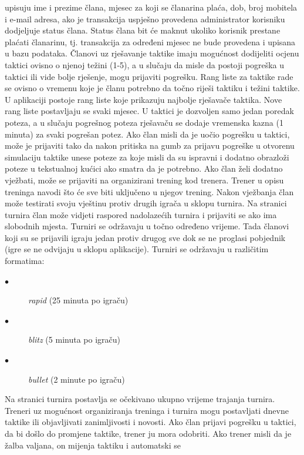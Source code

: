 			upisuju ime i prezime člana, mjesec za koji se članarina plaća, dob,
			broj mobitela i e-mail adresa, ako je transakcija uspješno provedena
			administrator korisniku dodjeljuje status člana. Status člana bit će
			maknut ukoliko korisnik prestane plaćati članarinu, tj. transakcija za
			određeni mjesec ne bude provedena i upisana u bazu podataka. Članovi uz
			rješavanje taktike imaju mogućnost dodijeliti ocjenu taktici ovisno o
			njenoj težini (1-5), a u slučaju da misle da postoji pogreška u taktici
			ili vide bolje rješenje, mogu prijaviti pogrešku. Rang liste za taktike
			rade se ovisno o vremenu koje je članu potrebno da točno riješi taktiku
			i težini taktike. U aplikaciji postoje rang liste koje prikazuju
			najbolje rješavače taktika. Nove rang liste postavljaju se svaki mjesec.
			U taktici je dozvoljen samo jedan poredak poteza, a u slučaju pogrešnog
			poteza rješavaču se dodaje vremenska kazna (1 minuta) za svaki pogrešan
			potez. Ako član misli da je uočio pogrešku u taktici, može je prijaviti
			tako da nakon pritiska na gumb za prijavu pogreške u otvorenu simulaciju
			taktike unese poteze za koje misli da su ispravni i dodatno obrazloži
			poteze u tekstualnoj kućici ako smatra da je potrebno. Ako član želi
			dodatno vježbati, može se prijaviti na organizirani trening kod trenera.
			Trener u opisu treninga navodi što će sve biti uključeno u njegov
			trening. Nakon vježbanja član može testirati svoju vještinu protiv
			drugih igrača u sklopu turnira. Na stranici turnira član može vidjeti
			raspored nadolazećih turnira i prijaviti se ako ima slobodnih mjesta.
			Turniri se održavaju u točno određeno vrijeme. Tada članovi koji su se
			prijavili igraju jedan protiv drugog sve dok se ne proglasi pobjednik
			(igre se ne odvijaju u sklopu aplikacije). Turniri se održavaju u
			različitim formatima:
			\begin{description} 
			\item[$\bullet$] \textit{rapid} (25 minuta po igraču)
		    \item[$\bullet$] \textit{blitz} (5 minuta po igraču)
			\item[$\bullet$] \textit{bullet} (2 minute po igraču)
		    \end{description}
			 Na stranici turnira postavlja se
			očekivano ukupno vrijeme trajanja turnira. Treneri uz mogućnost
			organiziranja treninga i turnira mogu postavljati dnevne taktike ili
			objavljivati zanimljivosti i novosti. Ako član prijavi pogrešku u
			taktici, da bi došlo do promjene taktike, trener ju mora odobriti. Ako
			trener misli da je žalba valjana, on mijenja taktiku i automatski se
